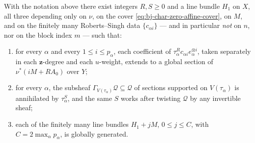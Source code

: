 \begin{lemma}
\label{lem:ch44-uniform-cutoffs}
With the notation above there exist integers $R,S\ge0$ and a line bundle
$H_1$ on $X$, all three depending only on $\nu$, on the cover
\eqref{eq:bj-char-zero-affine-cover}, on $M$, and on the finitely many
Roberts--Singh data $\{c_{\alpha i}\}$ --- and in particular
\emph{not} on $n$, nor on the block index $m$ --- such that:
\begin{enumerate}
\item\label{itm:ch44-cut:R}
      for every $\alpha$ and every $1\le i\le p_\alpha$, each coefficient
      of $\tau_\alpha^Rc_{\alpha i}e_\alpha^{\otimes i}$, taken separately
      in each $\mathbf z$-degree and each $u$-weight, extends to a
      global section of $\nu^*(iM+RA_0)$ over $Y$;
\item\label{itm:ch44-cut:S}
      for every $\alpha$, the subsheaf
      $\Gamma_{V(\tau_\alpha)}\mathcal Q\subseteq\mathcal Q$ of sections
      supported on $V(\tau_\alpha)$ is annihilated by $\tau_\alpha^S$,
      and the same $S$ works after twisting $\mathcal Q$ by any
      invertible sheaf;
\item\label{itm:ch44-cut:H1}
      each of the finitely many line bundles $H_1+jM$, $0\le j\le C$,
      with $C=2\max_\alpha p_\alpha$, is globally generated.
\end{enumerate}
\end{lemma}

